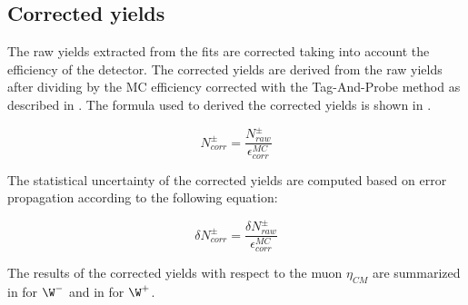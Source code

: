 

\subsection{Corrected yields}\label{sec:WBoson_SignalExtraction_CorrectedYields}

The raw yields extracted from the fits are corrected taking into account the efficiency of the detector. The corrected yields are derived from the raw yields after dividing by the MC efficiency corrected with the Tag-And-Probe method as described in . The formula used to derived the corrected yields is shown in .

\begin{equation}
N^{\pm}_{corr} = \frac{N^{\pm}_{raw}}{\epsilon^{MC}_{corr}}
\label{eq:CorrectedYield}
\end{equation}

The statistical uncertainty of the corrected yields are computed based on error propagation according to the following equation:

\begin{equation}
\delta{N^{\pm}_{corr}} = \frac{\delta{N^{\pm}_{raw}}}{\epsilon^{MC}_{corr}}
\label{eq:CorrectedYieldStatError}
\end{equation}

The results of the corrected yields with respect to the muon $\eta_{CM}$ are summarized in  for $\W^{-}$ and in  for $\W^{+}$.




